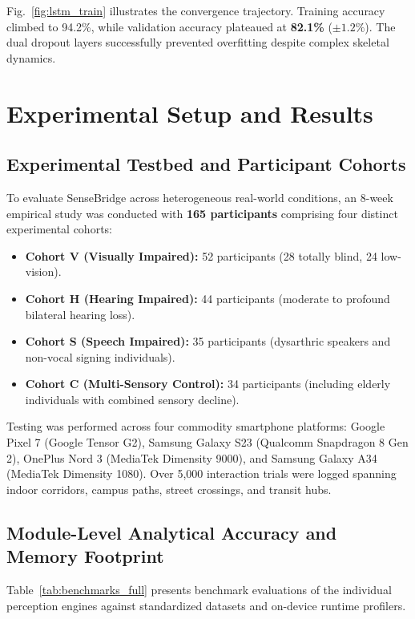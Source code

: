 \documentclass[conference]{IEEEtran}
\begin{document}
Fig.~\ref{fig:lstm_train} illustrates the convergence trajectory. Training accuracy climbed to 94.2\%, while validation accuracy plateaued at \textbf{82.1\%} ($\pm 1.2\%$). The dual dropout layers successfully prevented overfitting despite complex skeletal dynamics.

\section{Experimental Setup and Results}

\subsection{Experimental Testbed and Participant Cohorts}
To evaluate SenseBridge across heterogeneous real-world conditions, an 8-week empirical study was conducted with \textbf{165 participants} comprising four distinct experimental cohorts:
\begin{itemize}
    \item \textbf{Cohort V (Visually Impaired):} 52 participants (28 totally blind, 24 low-vision).
    \item \textbf{Cohort H (Hearing Impaired):} 44 participants (moderate to profound bilateral hearing loss).
    \item \textbf{Cohort S (Speech Impaired):} 35 participants (dysarthric speakers and non-vocal signing individuals).
    \item \textbf{Cohort C (Multi-Sensory Control):} 34 participants (including elderly individuals with combined sensory decline).
\end{itemize}

Testing was performed across four commodity smartphone platforms: Google Pixel 7 (Google Tensor G2), Samsung Galaxy S23 (Qualcomm Snapdragon 8 Gen 2), OnePlus Nord 3 (MediaTek Dimensity 9000), and Samsung Galaxy A34 (MediaTek Dimensity 1080). Over 5,000 interaction trials were logged spanning indoor corridors, campus paths, street crossings, and transit hubs.

\subsection{Module-Level Analytical Accuracy and Memory Footprint}
Table~\ref{tab:benchmarks_full} presents benchmark evaluations of the individual perception engines against standardized datasets and on-device runtime profilers.
\end{document}
